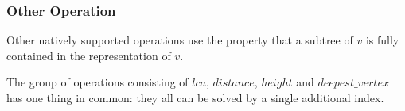 \begin{algorithmic}
		\State {}
	\Else
		\State {}
	\EndIf
\EndFunction
\end{algorithmic}

\begin{algorithmic}
		\State {}
	\Else
		\State {}
	\EndIf
\EndFunction
\end{algorithmic}

\begin{algorithmic}
		\State {}
	\Else
		\State {}
	\EndIf
\EndFunction
\end{algorithmic}

\begin{algorithmic}
		\State {}
	\Else
		\State {}
	\EndIf
\EndFunction
\end{algorithmic}

\subsubsection{Other Operation}

Other natively supported operations use the property that a subtree of $v$ is fully contained in the representation of $v$.

\begin{algorithmic}
	\State {}
\EndFunction
\end{algorithmic}

\begin{algorithmic}
	\State {}
\EndFunction
\end{algorithmic}

\begin{algorithmic}
	\State {}
\EndFunction
\end{algorithmic}

The group of operations consisting of $lca$, $distance$, $height$ and $deepest\_vertex$ has one thing in common: they all can be solved by a single additional index.

\begin{algorithmic}
		\State {}
		\State {}
	\Else
		\State {}
	\EndIf
\EndFunction
\end{algorithmic}

